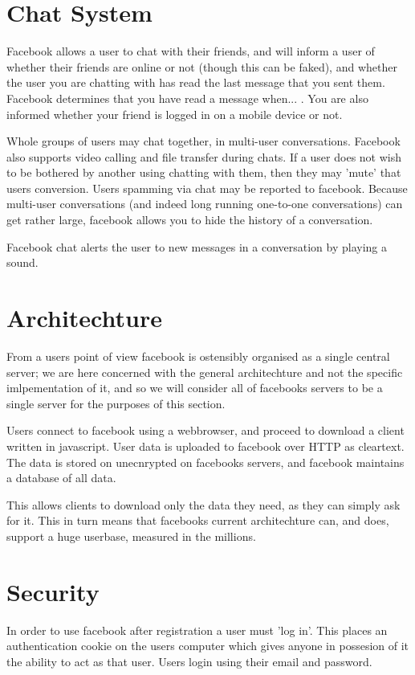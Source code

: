 \section{Chat System}
Facebook allows a user to chat with their friends, and will inform a user of
whether their friends are online or not (though this can be faked), and whether
the user you are chatting with has read the last message that you sent them.
Facebook determines that you have read a message when... . You are also informed whether your friend is logged in on a mobile
device or not.

Whole groups of users may chat together, in multi-user conversations. Facebook
also supports video calling and file transfer during chats. If a user does not
wish to be bothered by another using chatting with them, then they may 'mute'
that users conversion. Users spamming via chat may be reported to facebook.
Because multi-user conversations (and indeed long running one-to-one
conversations) can get rather large, facebook allows you to hide the history of
a conversation.

Facebook chat alerts the user to new messages in a conversation by playing a
sound.

\section{Architechture}
From a users point of view facebook is ostensibly organised as a single central
server; we are here concerned with the general architechture and not the
specific imlpementation of it, and so we will consider all of facebooks servers
to be a single server for the purposes of this section.

Users connect to facebook using a webbrowser, and proceed to download a client
written in javascript. User data is uploaded to facebook over HTTP as cleartext.
The data is stored on unecnrypted on facebooks servers, and facebook maintains
a database of all data.

This allows clients to download only the data they need, as they can simply ask
for it. This in turn means that facebooks current architechture can, and does,
support a huge userbase, measured in the millions.


\section{Security}
In order to use facebook after registration a user must 'log in'. This places an
authentication cookie on the users computer which gives anyone in possesion of
it the ability to act as that user. Users login using their email and password.

